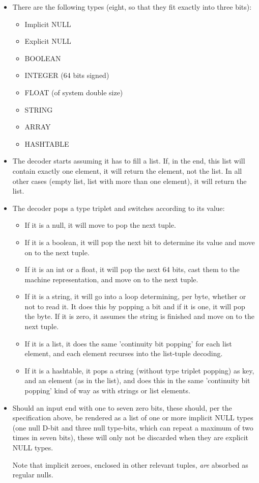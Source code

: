 \begin{itemize}
\item There are the following types (eight, so that they fit exactly
      into three bits):
  \begin{itemize}
  \item Implicit NULL
  \item Explicit NULL
  \item BOOLEAN
  \item INTEGER (64 bits signed)
  \item FLOAT (of system double size)
  \item STRING
  \item ARRAY
  \item HASHTABLE
  \end{itemize}

\item The decoder starts assuming it has to fill a list.
  If, in the end, this list will contain exactly one element, it will
  return the element, not the list. In all other cases (empty list,
  list with more than one element), it will return the list.

\item The decoder pops a type triplet and switches according to its value:
  \begin{itemize}
  \item If it is a null, it will move to pop the next tuple.
  \item If it is a boolean, it will pop the next bit to determine its value
        and move on to the next tuple.
  \item If it is an int or a float, it will pop the next 64 bits,
        cast them to the machine representation, and move on to the next tuple.
  \item If it is a string, it will go into a loop determining, per byte,
        whether or not to read it. It does this by popping a bit and if
        it is one, it will pop the byte. If it is zero, it assumes the
        string is finished and move on to the next tuple.
  \item If it is a list, it does the same 'continuity bit popping' for
        each list element, and each element recurses into the list-tuple
        decoding.
  \item If it is a hashtable, it pops a string (without type triplet popping)
        as key, and an element (as in the list), and does this in the same
        'continuity bit popping' kind of way as with strings or list elements.
  \end{itemize}

\item Should an input end with one to seven zero bits, these should, per the
  specification above, be rendered as a list of one or more implicit NULL types
  (one null D-bit and three null type-bits, which can repeat a maximum of
  two times in seven bits), these will only not be discarded when they
  are explicit NULL types.

  Note that implicit zeroes, enclosed in other relevant tuples, \textit{are}
  absorbed as regular nulls.
\end{itemize}

